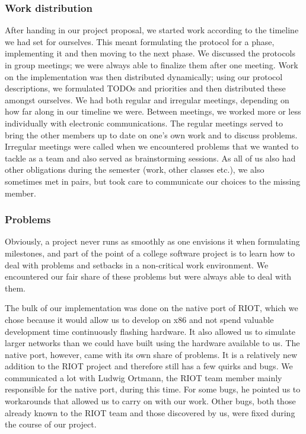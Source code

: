 \documentclass[11pt,
  a4paper,
  ngerman,
  BCOR=7mm
]{scrartcl}
\begin{document}
\subsubsection*{Work distribution}
\label{ssub:work_distribution}
After handing in our project proposal, we started work according to the
timeline we had set for ourselves. This meant formulating the protocol
for a phase, implementing it and then moving to the next phase. We
discussed the protocols in group meetings; we were always able to
finalize them after one meeting. Work on the implementation was then
distributed dynamically; using our protocol descriptions, we formulated
TODOs and priorities and then distributed these amongst ourselves. We
had both regular and irregular meetings, depending on how far along in
our timeline we were. Between meetings, we worked more or less
individually with electronic communications. The regular meetings served
to bring the other members up to date on one's own work and to discuss
problems. Irregular meetings were called when we encountered problems
that we wanted to tackle as a team and also served as brainstorming
sessions. As all of us also had other obligations during the semester
(work, other classes etc.), we also sometimes met in pairs, but took
care to communicate our choices to the missing member.

\subsubsection*{Problems}
\label{ssub:problems}
Obviously, a project never runs as smoothly as one envisions it when
formulating milestones, and part of the point of a college software
project is to learn how to deal with problems and setbacks in
a non-critical work environment. We encountered our fair share of these
problems but were always able to deal with them.

The bulk of our implementation was done on the native port of RIOT,
which we chose because it would allow us to develop on x86 and not spend
valuable development time continuously flashing hardware. It also
allowed us to simulate larger networks than we could have built using
the hardware available to us. The native port, however, came with its
own share of problems. It is a relatively new addition to the RIOT
project and therefore still has a few quirks and bugs. We communicated
a lot with Ludwig Ortmann, the RIOT team member mainly responsible for
the native port, during this time. For some bugs, he pointed us to
workarounds that allowed us to carry on with our work. Other bugs, both
those already known to the RIOT team and those discovered by us, were
fixed during the course of our project.
\end{document}
